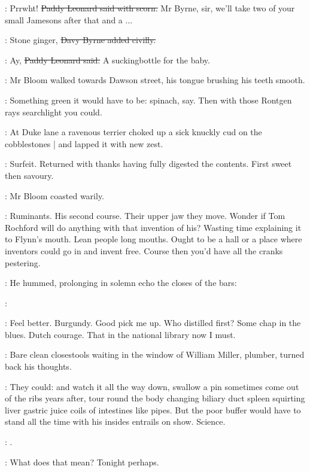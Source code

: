 \leonard:
Prrwht!
\sout{Paddy Leonard said with scorn.}
Mr Byrne, sir,
we'll take two of your small Jamesons after that and a ...

\davybyrne:
Stone ginger,
\sout{Davy Byrne added civilly.}

\leonard:
Ay,
\sout{Paddy Leonard said.}
A suckingbottle for the baby.

:
Mr Bloom walked towards Dawson street,
his tongue brushing his teeth smooth.

\BloomInt:
Something green it would have to be:
spinach, say.
Then with those Rontgen rays searchlight
you could.

:
At Duke lane
a ravenous terrier choked up a sick knuckly cud on the cobblestones |
and lapped it with new zest.

\BloomInt:
Surfeit.
Returned with thanks having fully digested the contents.
First sweet then savoury.

:
Mr Bloom coasted warily.

\BloomInt:
Ruminants.
His second course.
Their upper jaw they move.
Wonder if Tom Rochford will do anything with that invention of his?
Wasting time explaining it to Flynn's mouth.
Lean people long mouths.
Ought to be a hall or a place where inventors could go in and invent free.
Course then you'd have all the cranks pestering.

:
He hummed,
prolonging in solemn echo the closes of the bars:

\Bloom:


\BloomInt:
Feel better.
Burgundy.
Good pick me up.
Who distilled first?
Some chap in the blues.
Dutch courage.
That  in the national library now I must.

:
Bare clean closestools waiting in the window of William Miller, plumber,
turned back his thoughts.

\BloomInt:
They could:
and watch it all the way down,
swallow a pin sometimes come out of the ribs years after,
tour round the body changing biliary duct spleen
squirting liver gastric juice
coils of intestines like pipes.
But the poor buffer would have to stand
all the time with his insides entrails on show.
Science.

\Bloom:
.

\BloomInt:
What does that  mean?
Tonight perhaps.

